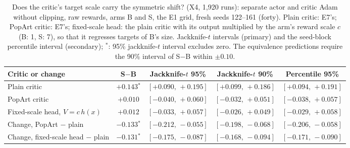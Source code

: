 \begin{table}[!htbp]
\caption{Does the critic's target scale carry the symmetric shift? (X4, 1,920 runs): separate actor and critic Adam without clipping, raw rewards, arms B and S, the E1 grid, fresh seeds 122--161 (forty). Plain critic: E7's; PopArt critic: E7's; fixed-scale head: the plain critic with its output multiplied by the arm's reward scale $c$ (B: 1, S: 7), so that it regresses targets of B's size. Jackknife-$t$ intervals (primary) and the seed-block percentile interval (secondary); $^{\ast}$: 95\% jackknife-$t$ interval excludes zero. The equivalence predictions require the 90\% interval of S$-$B within $\pm0.10$.}
\label{tab:x4}
\centering\footnotesize
\begin{tabular}{@{}>{\raggedright\arraybackslash}p{}cccc@{}}
\toprule
Critic or change & S$-$B & Jackknife-$t$ 95\% & Jackknife-$t$ 90\% & Percentile 95\% \\
\midrule
Plain critic & $+0.143$$^{\ast}$ & $[+0.090,\,+0.195]$ & $[+0.099,\,+0.186]$ & $[+0.094,\,+0.191]$ \\
PopArt critic & $+0.010$ & $[-0.040,\,+0.060]$ & $[-0.032,\,+0.051]$ & $[-0.038,\,+0.057]$ \\
Fixed-scale head, $V=c\,h(x)$ & $+0.012$ & $[-0.033,\,+0.057]$ & $[-0.026,\,+0.049]$ & $[-0.029,\,+0.058]$ \\
Change, PopArt $-$ plain & $-0.133$$^{\ast}$ & $[-0.212,\,-0.055]$ & $[-0.198,\,-0.068]$ & $[-0.206,\,-0.058]$ \\
Change, fixed-scale head $-$ plain & $-0.131$$^{\ast}$ & $[-0.175,\,-0.087]$ & $[-0.168,\,-0.094]$ & $[-0.171,\,-0.090]$ \\
\bottomrule
\end{tabular}
\end{table}
